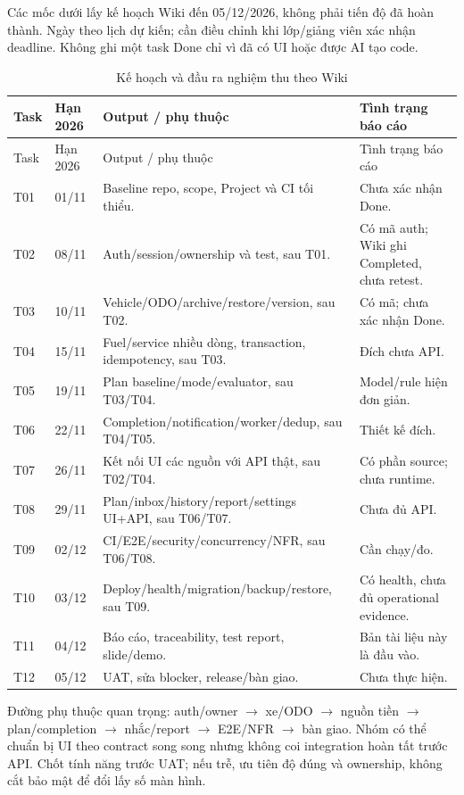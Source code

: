Các mốc dưới lấy kế hoạch Wiki đến 05/12/2026, không phải tiến độ đã hoàn thành. Ngày theo lịch dự kiến; cần điều chỉnh khi lớp/giảng viên xác nhận deadline. Không ghi một task Done chỉ vì đã có UI hoặc được AI tạo code.
\begin{smalltable}\begin{longtable}{L{1.3cm}L{2cm}L{8.7cm}L{2.5cm}}
\caption{Kế hoạch và đầu ra nghiệm thu theo Wiki}\label{tab:plan}\\\toprule Task & Hạn 2026 & Output / phụ thuộc & Tình trạng báo cáo\\\midrule\endfirsthead
\toprule Task & Hạn 2026 & Output / phụ thuộc & Tình trạng báo cáo\\\midrule\endhead
T01 & 01/11 & Baseline repo, scope, Project và CI tối thiểu. & Chưa xác nhận Done.\\
T02 & 08/11 & Auth/session/ownership và test, sau T01. & Có mã auth; Wiki ghi Completed, chưa retest.\\
T03 & 10/11 & Vehicle/ODO/archive/restore/version, sau T02. & Có mã; chưa xác nhận Done.\\
T04 & 15/11 & Fuel/service nhiều dòng, transaction, idempotency, sau T03. & Đích chưa API.\\
T05 & 19/11 & Plan baseline/mode/evaluator, sau T03/T04. & Model/rule hiện đơn giản.\\
T06 & 22/11 & Completion/notification/worker/dedup, sau T04/T05. & Thiết kế đích.\\
T07 & 26/11 & Kết nối UI các nguồn với API thật, sau T02/T04. & Có phần source; chưa runtime.\\
T08 & 29/11 & Plan/inbox/history/report/settings UI+API, sau T06/T07. & Chưa đủ API.\\
T09 & 02/12 & CI/E2E/security/concurrency/NFR, sau T06/T08. & Cần chạy/đo.\\
T10 & 03/12 & Deploy/health/migration/backup/restore, sau T09. & Có health, chưa đủ operational evidence.\\
T11 & 04/12 & Báo cáo, traceability, test report, slide/demo. & Bản tài liệu này là đầu vào.\\
T12 & 05/12 & UAT, sửa blocker, release/bàn giao. & Chưa thực hiện.\\\bottomrule
\end{longtable}\end{smalltable}

Đường phụ thuộc quan trọng: auth/owner $\rightarrow$ xe/ODO $\rightarrow$ nguồn tiền $\rightarrow$ plan/completion $\rightarrow$ nhắc/report $\rightarrow$ E2E/NFR $\rightarrow$ bàn giao. Nhóm có thể chuẩn bị UI theo contract song song nhưng không coi integration hoàn tất trước API. Chốt tính năng trước UAT; nếu trễ, ưu tiên độ đúng và ownership, không cắt bảo mật để đổi lấy số màn hình.

